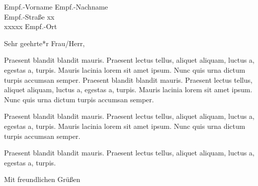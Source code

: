 \documentclass[12pt]{scrlttr2}
\begin{document}
\begin{letter}{Empf.-Vorname Empf.-Nachname\\Empf.-Straße xx\\xxxxx Empf.-Ort}
\opening{Sehr geehrte*r Frau/Herr,}
\RaggedRight
Praesent blandit blandit mauris. Praesent lectus tellus, aliquet aliquam, luctus a, egestas a, turpis. Mauris lacinia lorem sit amet ipsum. Nunc quis urna dictum turpis accumsan semper. Praesent blandit blandit mauris. Praesent lectus tellus, aliquet aliquam, luctus a, egestas a, turpis. Mauris lacinia lorem sit amet ipsum. Nunc quis urna dictum turpis accumsan semper.

Praesent blandit blandit mauris. Praesent lectus tellus, aliquet aliquam, luctus a, egestas a, turpis. Mauris lacinia lorem sit amet ipsum. Nunc quis urna dictum turpis accumsan semper.

Praesent blandit blandit mauris. Praesent lectus tellus, aliquet aliquam, luctus a, egestas a, turpis. 
\closing{Mit freundlichen Grüßen}
\end{letter}
\end{document}
